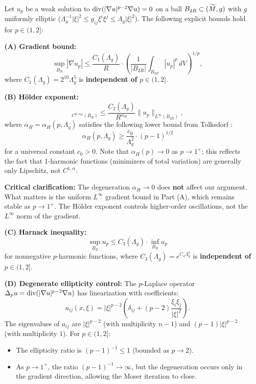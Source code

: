 \begin{proposition}\label{prop:TolksdorfQuantitative}
Let $u_p$ be a weak solution to $\mathrm{div}(|\nabla u|^{p-2} \nabla u) = 0$ on a ball $B_{2R} \subset (\widetilde{M}, g)$ with $g$ uniformly elliptic ($\Lambda_g^{-1}|\xi|^2 \le g_{ij}\xi^i\xi^j \le \Lambda_g|\xi|^2$). The following explicit bounds hold for $p \in (1, 2]$:

\textbf{(A) Gradient bound:}
\begin{equation}
    \sup_{B_R} |\nabla u_p| \le \frac{C_1(\Lambda_g)}{R} \cdot \left( \frac{1}{|B_{2R}|} \int_{B_{2R}} |u_p|^p \, dV \right)^{1/p},
\end{equation}
where $C_1(\Lambda_g) = 2^{10} \Lambda_g^{5}$ is \textbf{independent of $p \in (1,2]$}.

\textbf{(B) H\"older exponent:}
\begin{equation}
    [u_p]_{C^{0,\alpha_H}(B_R)} \le \frac{C_2(\Lambda_g)}{R^{\alpha_H}} \|u_p\|_{L^\infty(B_{2R})},
\end{equation}
where $\alpha_H = \alpha_H(p, \Lambda_g)$ satisfies the following lower bound from Tolksdorf \cite{tolksdorf1984}:
\begin{equation}
    \alpha_H(p, \Lambda_g) \ge \frac{c_0}{\Lambda_g^2} \cdot (p-1)^{1/2}
\end{equation}
for a universal constant $c_0 > 0$. Note that $\alpha_H(p) \to 0$ as $p \to 1^+$; this reflects the fact that 1-harmonic functions (minimizers of total variation) are generally only Lipschitz, not $C^{1,\alpha}$.

\textbf{Critical clarification:} The degeneration $\alpha_H \to 0$ does \textbf{not} affect our argument. What matters is the uniform $L^\infty$ gradient bound in Part (A), which remains stable as $p \to 1^+$. The H\"older exponent controls higher-order oscillations, not the $L^\infty$ norm of the gradient.

\textbf{(C) Harnack inequality:}
\begin{equation}
    \sup_{B_R} u_p \le C_3(\Lambda_g) \cdot \inf_{B_R} u_p
\end{equation}
for nonnegative $p$-harmonic functions, where $C_3(\Lambda_g) = e^{C_4 \Lambda_g^3}$ is \textbf{independent of $p \in (1,2]$}.

\textbf{(D) Degenerate ellipticity control:}
The $p$-Laplace operator $\Delta_p u = \mathrm{div}(|\nabla u|^{p-2} \nabla u)$ has linearization with coefficients:
\begin{equation}
    a_{ij}(x, \xi) = |\xi|^{p-2} \left( \delta_{ij} + (p-2) \frac{\xi_i \xi_j}{|\xi|^2} \right).
\end{equation}
The eigenvalues of $a_{ij}$ are $|\xi|^{p-2}$ (with multiplicity $n-1$) and $(p-1)|\xi|^{p-2}$ (with multiplicity $1$). For $p \in (1, 2]$:
\begin{itemize}
    \item The ellipticity ratio is $(p-1)^{-1} \le 1$ (bounded as $p \to 2$).
    \item As $p \to 1^+$, the ratio $(p-1)^{-1} \to \infty$, but the degeneration occurs only in the gradient direction, allowing the Moser iteration to close.
\end{itemize}


\end{proposition}
